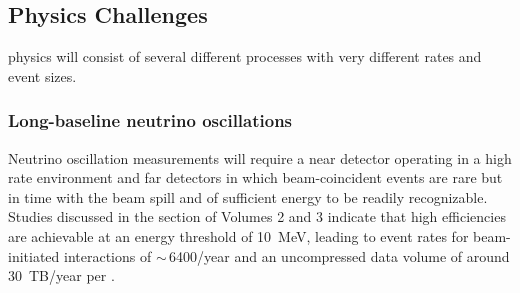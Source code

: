 %



\subsection{Physics Challenges}

  physics will consist of several different processes with very different rates and event sizes. 


\subsubsection{Long-baseline neutrino oscillations} Neutrino oscillation measurements will require a near detector operating in a high rate environment and far detectors in which beam-coincident events are rare but in time with the beam spill and of sufficient energy to be readily recognizable.  Studies discussed in the  section of   Volumes 2 and 3 indicate that high efficiencies are achievable at an energy threshold of \SI{10}{MeV}, leading to event rates for beam-initiated  interactions of $\sim$\,\num{6400}/year and an uncompressed data volume of around \SI{30}{TB/year} per \larmass {}.



